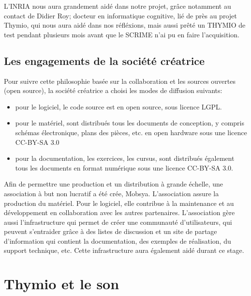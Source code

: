 \documentclass[a4paper, 12pt]{report}
\begin{document}
L'INRIA nous aura grandement aidé dans notre projet, grâce notamment au contact de Didier Roy; docteur en informatique cognitive, lié de près au projet Thymio, qui nous aura aidé dans nos réfléxions, mais aussi prêté un THYMIO de test pendant plusieurs mois avant que le SCRIME n'ai pu en faire l'acquisition.

\section{Les engagements de la société créatrice \cite{thymio2016}}
Pour suivre cette philosophie basée sur la collaboration et les sources ouvertes (open source), la société créatrice a choisi les modes de diffusion suivants:
\begin{itemize}
\item pour le logiciel, le code source est en open source, sous licence LGPL.
\item pour le matériel, sont distribués tous les documents de conception, y compris schémas électronique, plans des pièces, etc. en open hardware sous une licence CC-BY-SA 3.0
\item pour la documentation, les exercices, les cursus, sont distribués également tous les documents en format numérique sous une licence CC-BY-SA 3.0.
\end{itemize}

Afin de permettre une production et un distribution à grande échelle, une association à but non lucratif a été crée, Mobsya. L'association assure la production du matériel. Pour le logiciel, elle contribue à la maintenance et au développement en collaboration avec les autres partenaires. L'association gère aussi l'infrastructure qui permet de créer une communauté d'utilisateurs, qui peuvent s'entraider grâce à des listes de discussion et un site de partage d'information qui contient la documentation, des exemples de réalisation, du support technique, etc. Cette infrastructure aura également aidé durant ce stage.

\chapter{Thymio et le son \cite{thymio2016}}
\end{document}
